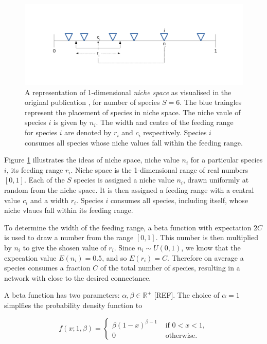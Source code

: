 \begin{figure}
	\centering
	\includegraphics[width=\textwidth]{"diagrams/niche_model"}
	\caption{A representation of 1-dimensional \emph{niche space} as visualised in the original publication \cite{williams2000simple}, for number of species $S=6$. The blue traingles represent the placement of species in niche space. The niche vaule of species $i$ is given by $n_i$. The width and centre of the feeding range for species $i$ are denoted by $r_i$ and $c_i$ respectively. Species $i$ consumes all species whose niche values fall within the feeding range.}
	\label{fig:niche_model}
\end{figure}


Figure \ref{fig:niche_model} illustrates the ideas of niche space, niche value $n_i$ for a particular species $i$, its feeding range $r_i$. Niche space is the 1-dimensional range of real numbers $[0,1]$. Each of the $S$ species is assigned a niche value $n_i$, drawn uniformly at random from the niche space. It is then assigned a feeding range with a central value $c_i$ and a width $r_i$. Species $i$ consumes all species, including itself, whose niche vlaues fall within its feeding range.

To determine the width of the feeding range, a beta function  with expectation $2C$ is used to draw a number from the range $[0,1]$. This number is then multiplied by $n_i$ to give the shosen value of $r_i$.  Since $n_i \sim U(0,1)$, we know that the expecation value $E(n_i) = 0.5$, and so $E(r_i) = C$. Therefore on average a species consumes a fraction $C$ of the total number of species, resulting in a network with close to the desired connectance.  


A beta function has two parameters: $\alpha, \beta \in \mathbb{R^+}$ [REF]. The choice of $\alpha = 1$ simplfies the probability density function to

\begin{equation*}
f (x; 1,\beta) = \begin{cases}
\beta (1-x)^{\beta - 1} &\mbox{ if } 0 < x < 1,  \\
0	                    &\mbox{ otherwise. }
\end{cases}
\label{eq:beta_pdf}
\end{equation*}

